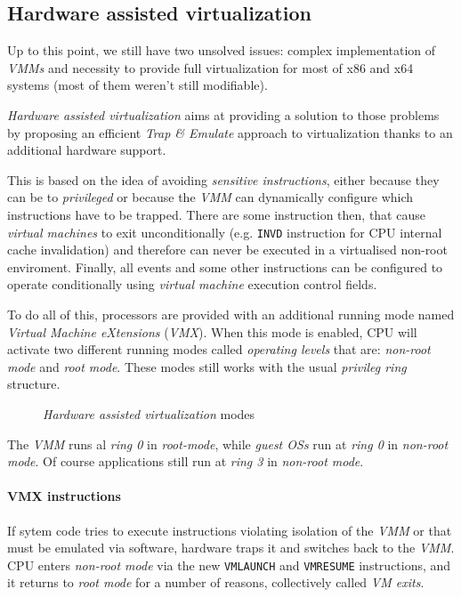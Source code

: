 \subsection{Hardware assisted virtualization}
Up to this point, we still have two unsolved issues: complex implementation of
\emph{VMMs} and necessity to provide full virtualization for most of x86 and x64
systems (most of them weren't still modifiable).

\emph{Hardware assisted virtualization} aims at providing a solution to those
problems by proposing an efficient \emph{Trap \& Emulate} approach to
virtualization thanks to an additional hardware support.

This is based on the idea of avoiding \emph{sensitive instructions}, either
because they can be  to \emph{privileged} or because the \emph{VMM}
can dynamically configure which instructions have to be trapped. There are some
instruction then, that cause \emph{virtual machines} to exit unconditionally
(e.g. \texttt{INVD} instruction for CPU internal cache invalidation) and therefore
can never be executed in a virtualised non-root enviroment. Finally, all
events and some other instructions can be configured to operate conditionally
using \emph{virtual machine} execution control fields.

To do all of this, processors are provided with an additional running mode
named \emph{Virtual Machine eXtensions} (\emph{VMX}). When this mode is enabled,
CPU will activate two different running modes called \emph{operating levels}
that are: \emph{non-root mode} and \emph{root mode}. These modes still works
with the usual \emph{privileg ring} structure.

\begin{figure}[h!]
    \centering
    \caption{\emph{Hardware assisted virtualization} modes}
\end{figure}\noindent
The \emph{VMM} runs al \emph{ring 0} in \emph{root-mode}, while \emph{guest OSs}
run at \emph{ring 0} in \emph{non-root mode}. Of course applications still run
at \emph{ring 3} in \emph{non-root mode}.

\paragraph{VMX instructions}
If sytem code tries to execute instructions violating isolation of the \emph{VMM}
or that must be emulated via software, hardware traps it and switches back to
the \emph{VMM}. CPU enters \emph{non-root mode} via the new \texttt{VMLAUNCH}
and \texttt{VMRESUME} instructions, and it returns to \emph{root mode} for a
number of reasons, collectively called \emph{VM exits}.

